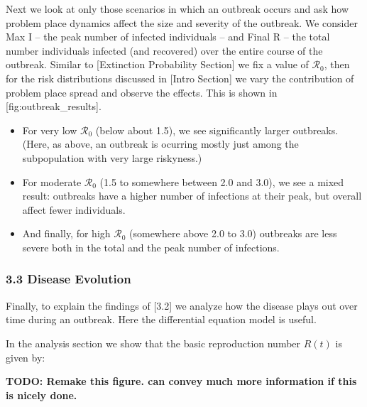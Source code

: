 Next we look at only those scenarios in which an outbreak occurs and ask
how problem place dynamics affect the size and severity of the outbreak.
We consider Max I -- the peak number of infected individuals -- and
Final R -- the total number individuals infected (and recovered) over
the entire course of the outbreak. Similar to {[}Extinction Probability
Section{]} we fix a value of \(\mathcal{R}_0\), then for the risk
distributions discussed in {[}Intro Section{]} we vary the contribution
of problem place spread and observe the effects. This is shown in
{[}fig:outbreak\_results{]}.

\begin{itemize}
\tightlist
\item
  For very low \(\mathcal{R}_0\) (below about 1.5), we see significantly
  larger outbreaks. (Here, as above, an outbreak is ocurring mostly just
  among the subpopulation with very large riskyness.)
\item
  For moderate \(\mathcal{R}_0\) (1.5 to somewhere between 2.0 and 3.0),
  we see a mixed result: outbreaks have a higher number of infections at
  their peak, but overall affect fewer individuals.
\item
  And finally, for high \(\mathcal{R}_0\) (somewhere above 2.0 to 3.0)
  outbreaks are less severe both in the total and the peak number of
  infections.
\end{itemize}

\subsubsection{3.3 Disease Evolution}\label{disease-evolution}

Finally, to explain the findings of {[}3.2{]} we analyze how the disease
plays out over time during an outbreak. Here the differential equation
model is useful.

In the analysis section we show that the basic reproduction number
\(R(t)\) is given by:

\textbf{TODO: Remake this figure. can convey much more information if
this is nicely done.}

